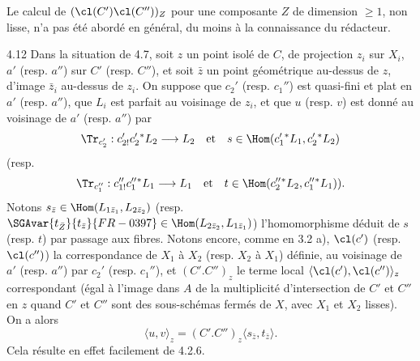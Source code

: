 Le calcul de $(\cl(C')\cl(C''))_Z$ pour une composante $Z$ de dimension $\geq 1$, non lisse, n'a pas été abordé en général, du moins à la connaissance du rédacteur.

\begin{statement}{4.12}
Dans la situation de 4.7, soit $z$ un point isolé de $C$, de projection $z_i$ sur $X_i$, $a'$ (resp. $a''$) sur $C'$ (resp. $C''$), et soit $\bar z$ un point géométrique au-dessus de $z$, d'image $\bar z_i$ au-dessus de $z_i$. On suppose que $c_2'$ (resp. $c_1''$) est quasi-fini et plat en $a'$ (resp. $a''$), que $L_i$ est parfait au voisinage de $z_i$, et que $u$ (resp. $v$) est donné au voisinage de $a'$ (resp. $a''$) par
\[
\Tr_{c_2'}:c_{2!}'c_2'{}^*L_2\longrightarrow L_2
\quad\text{et}\quad
s\in\Hom(c_1'{}^*L_1,c_2'{}^*L_2)
\]
(resp.
\[
\Tr_{c_1''}:c_{1!}''c_1''{}^*L_1\longrightarrow L_1
\quad\text{et}\quad
t\in\Hom(c_2''{}^*L_2,c_1''{}^*L_1)).
\]
Notons $s_{\bar z}\in\Hom(L_{1\bar z_1},L_{2\bar z_2})$ (resp. $\SGAvar{t_{\bar Z}}{t_{\bar z}}{FR-0397}\in\Hom(L_{2\bar z_2},L_{1\bar z_1})$) l'homomorphisme déduit de $s$ (resp. $t$) par passage aux fibres. Notons encore, comme en 3.2 a), $\cl(c')$ (resp. $\cl(c'')$) la correspondance de $X_1$ à $X_2$ (resp. $X_2$ à $X_1$) définie, au voisinage de $a'$ (resp. $a''$) par $c_2'$ (resp. $c_1''$), et $(C'.C'')_z$ le terme local $\langle\cl(c'),\cl(c'')\rangle_z$ correspondant (égal à l'image dans $A$ de la
multiplicité d'intersection de $C'$ et $C''$ en $z$ quand $C'$ et $C''$ sont des sous-schémas fermés de $X$, avec $X_1$ et $X_2$ lisses). On a alors
\begin{equation}
\tag{4.12.1}
\langle u,v\rangle_z=(C'.C'')_z\langle s_{\bar z},t_{\bar z}\rangle.
\end{equation}
Cela résulte en effet facilement de 4.2.6.
\end{statement}

